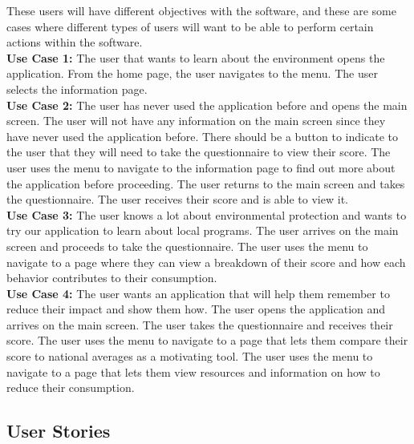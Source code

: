 \documentclass[onecolumn, draftclsnofoot,10pt, compsoc, tikz]{IEEEtran}
\begin{document}
These users will have different objectives with the software, and these are some cases where different types of users will want to be able to perform certain actions within the software. \\



\textbf{Use Case 1:}
The user that wants to learn about the environment opens the application. 
From the home page, the user navigates to the menu.
The user selects the information page. \\



\textbf{Use Case 2:}
The user has never used the application before and opens the main screen.
The user will not have any information on the main screen since they have never used the application before.
There should be a button to indicate to the user that they will need to take the questionnaire to view their score.
The user uses the menu to navigate to the information page to find out more about the application before proceeding.
The user returns to the main screen and takes the questionnaire.
The user receives their score and is able to view it. \\



\textbf{Use Case 3:}
The user knows a lot about environmental protection and wants to try our application to learn about local programs.
The user arrives on the main screen and proceeds to take the questionnaire.
The user uses the menu to navigate to a page where they can view a breakdown of their score and how each behavior contributes to their consumption. \\



\textbf{Use Case 4:}
The user wants an application that will help them remember to reduce their impact and show them how.
The user opens the application and arrives on the main screen.
The user takes the questionnaire and receives their score.
The user uses the menu to navigate to a page that lets them compare their score to national averages as a motivating tool.
The user uses the menu to navigate to a page that lets them view resources and information on how to reduce their consumption. \\



\subsection{User Stories}
\end{document}
